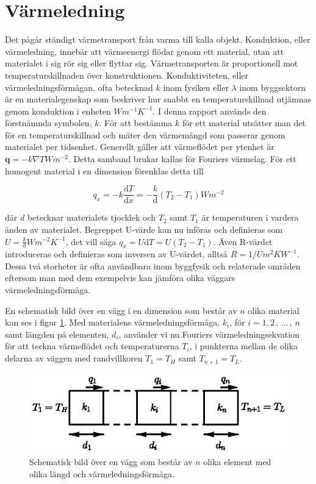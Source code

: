\section{Värmeledning}
\label{sec:heatconduction}

Det pågår ständigt värmetransport från varma till kalla objekt. Konduktion, eller värmeledning, innebär att värmeenergi flödar genom ett material, utan att materialet i sig rör sig eller flyttar sig. Värmetransporten är proportionell mot temperaturskillnaden över konstruktionen. Konduktiviteten, eller värmeledningsförmågan, ofta betecknad $k$ inom fysiken eller $\lambda$ inom byggsektorn är en materialegenskap som beskriver hur snabbt en temperaturskillnad utjämnas genom konduktion i enheten $\unit{Wm^{-1}K^{-1}}$. I denna rapport används den förstnämnda symbolen, $k$. För att bestämma $k$ för ett material utsätter man det för en temperaturskillnad och mäter den värmemängd som passerar genom materialet per tidsenhet. Generellt gäller att värmeflödet per ytenhet är $\mathbf{q} = - k \nabla T \unit{Wm^{-2}}$. Detta samband brukar kallas för Fouriers värmelag. För ett homogent material i en dimension förenklas detta till

\begin{equation}\label{eq:conduction:fourier}\boxed{ \; \; \;
q_x = -k \frac{\mathrm{d}T}{\mathrm{d}x} = -\frac{k}{\mathrm{d}}\left( T_2-T_1\right) \unit{Wm^{-2}}
\; \; \; }
\end{equation}

där $d$ betecknar materialets tjocklek och $T_2$ samt $T_1$ är temperaturen i vardera änden av materialet. Begreppet U-värde kan nu införas och definieras som $U = \frac{k}{\mathrm{d}} \unit{Wm^{-2}K^{-1}}$, det vill säga $q_x = U\mathrm{d}T = U\left( T_2-T_1 \right)$. Även R-värdet introduceras och definieras som inversen av U-värdet, alltså $R=1/U \unit{m^2KW^{-1}}$. Dessa två storheter är ofta användbara inom byggfysik och relaterade områden eftersom man med dem exempelvis kan jämföra olika väggars värmeledningsförmåga.

En schematisk bild över en vägg i en dimension som består av $n$ olika material kan ses i figur \ref{fig:staticwallmethod:wall}. Med materialens värmeledningsförmåga, $k_i$, för $i=1,2\,,\,...\,,\,n$ samt längden på elementen, $d_i$, använder vi nu Fouriers värmeledningsekvation för att teckna värmeflödet och temperaturerna $T_i$, i punkterna mellan de olika delarna av väggen med randvillkoren $T_1 = T_H$ samt $T_{n+1} = T_L$.

\begin{figure}[hpbt]
\centering
\includegraphics[scale=1.2]{images/wall.eps}
\caption{Schematisk bild över en vägg som består av $n$ olika element med olika
längd och värmeledningsförmåga.}\label{fig:staticwallmethod:wall}
\end{figure}

